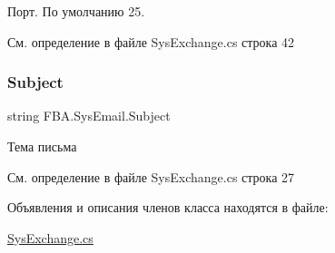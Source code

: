 Порт. По умолчанию 25. 



См. определение в файле Sys\+Exchange.\+cs строка 42

\mbox{\label{class_f_b_a_1_1_sys_email_a8e115c41139040518c849daa5178ecd0}} 
\subsubsection{\texorpdfstring{Subject}{Subject}}
{\footnotesize\ttfamily string F\+B\+A.\+Sys\+Email.\+Subject}



Тема письма 



См. определение в файле Sys\+Exchange.\+cs строка 27



Объявления и описания членов класса находятся в файле\+:\begin{DoxyCompactItemize}
\item 
\mbox{\hyperlink{_sys_exchange_8cs}{Sys\+Exchange.\+cs}}\end{DoxyCompactItemize}
